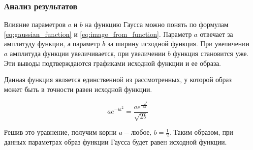 \subsubsection{Анализ результатов}
Влияние параметров $a$ и $b$ на функцию Гаусса можно понять по формулам \eqref{eq:gaussian_function} и \eqref{eq:image_from_function}. Параметр $a$ отвечает за амплитуду функции, а параметр $b$ за ширину исходной функция. При увеличении $a$ амплитуда функции увеличивается, при увеличении $b$ функция становится уже. 
Эти выводы подтверждаются графиками исходной функции и ее образа.

Данная функция является единственной из рассмотренных, у которой образ может быть в точности равен исходной функции. 

\begin{equation}
    ae^{-bt^2} = \frac{ae^{\frac{-\omega^2}{4b}}}{\sqrt{2b}}
\end{equation}

Решив это уравнение, получим корни $a - \text{любое}$, $b = \frac{1}{2}$. Таким образом, при данных параметрах образ функции Гаусса будет равен исходной функции.